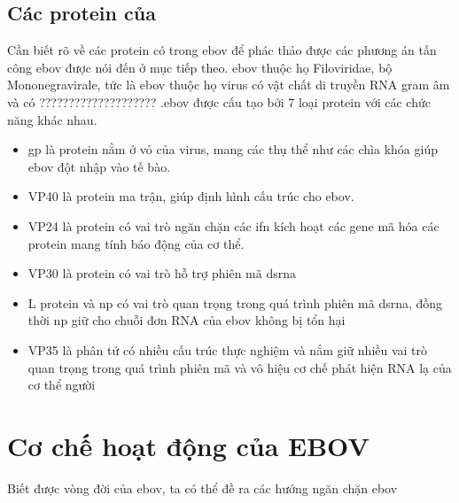 \documentclass[12pt,a4paper,reqno, oneside]{book}
\begin{document}
\subsection{Các protein của }
\hspace{18pt}
	Cần biết rõ về các protein có trong \gls{ebov} để phác thảo được các phương án tấn công \gls{ebov} được nói đến ở mục tiếp theo.
	\Gls{ebov} thuộc họ Filoviridae, bộ Mononegravirale\cite{Kuhn2010}, tức là \gls{ebov} thuộc họ virus có vật chất di truyền RNA gram âm và có ???????????????????? .\Gls{ebov} được cấu tạo bởi 7 loại protein với các chức năng khác nhau\cite{}.
	\begin{itemize}
	\item \gls{gp} là protein nằm ở vỏ của virus, mang các thụ thể như các chìa khóa giúp \gls{ebov} đột nhập vào tế bào\cite{}.
	\item VP40 là protein ma trận, giúp định hình cấu trúc cho \gls{ebov}\cite{}.
	\item VP24 là protein có vai trò ngăn chặn các \gls{ifn} kích hoạt các gene mã hóa các protein mang tính báo động của cơ thể\cite{}.
	\item VP30 là protein có vai trò hỗ trợ phiên mã \gls{dsrna}\cite{Weik2002}
	\item L protein và \gls{np}\cite{Feldmann2003,Dziubanska:be5269} có vai trò quan trọng trong quá trình phiên mã \gls{dsrna}, đồng thời \gls{np} giữ cho chuỗi đơn RNA của \gls{ebov} không bị tổn hại\cite{Dziubanska:be5269}
	\item VP35 là phân tử có nhiều cấu trúc thực nghiệm và nắm giữ nhiều vai trò quan trọng trong quá trình phiên mã và vô hiệu cơ chế phát hiện RNA lạ của cơ thể người\cite{}
	\end{itemize}

\section{Cơ chế hoạt động của EBOV}
Biết được vòng đời của \gls{ebov}, ta có thể đề ra các hướng ngăn chặn \gls{ebov}
\end{document}

